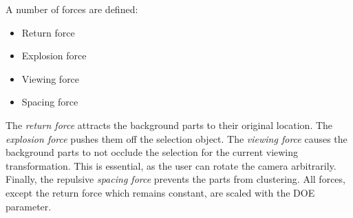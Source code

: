 A number of forces are defined:
\begin{itemize}
	\item Return force
	\item Explosion force
	\item Viewing force
	\item Spacing force
\end{itemize}

The \emph{return force} attracts the background parts to their original location. The \emph{explosion force} pushes them off the selection object. The \emph{viewing force} causes the background parts to not occlude the selection for the current viewing transformation. This is essential, as the user can rotate the camera arbitrarily. Finally, the repulsive \emph{spacing force} prevents the parts from clustering. All forces, except the return force which remains constant, are scaled with the DOE parameter.


